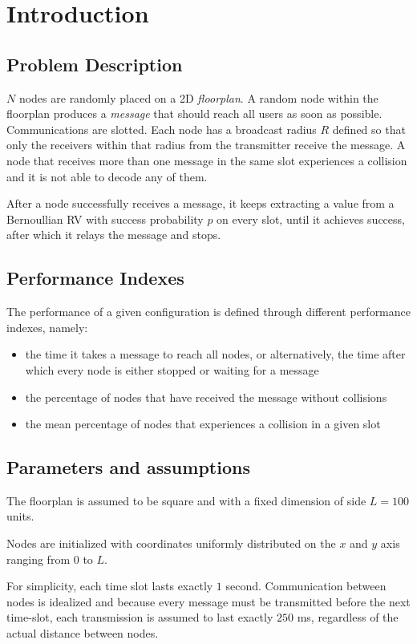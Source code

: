 \section{Introduction}
\subsection{Problem Description}
$N$ nodes are randomly placed on a 2D \textit{floorplan}. A random node within the floorplan produces a \textit{message} that should reach all users as soon as possible. Communications are slotted. Each node has a broadcast radius $R$ defined so that only the receivers within that radius from the transmitter receive the message. A node that receives more than one message in the same slot experiences a collision and it is not able to decode any of them.

After a node successfully receives a message, it keeps extracting a value from a Bernoullian RV with success probability $p$ on every slot, until it achieves success, after which it relays the message and stops.

\subsection{Performance Indexes}\label{sec:perf-index}
The performance of a given configuration is defined through different performance indexes, namely:
\begin{itemize}
\item the time it takes a message to reach all nodes, or alternatively, the time after which every node is either stopped or waiting for a message
\item the percentage of nodes that have received the message without collisions
\item the mean percentage of nodes that experiences a collision in a given slot
\end{itemize}
\subsection{Parameters and assumptions}\label{params-and-assumtions}
The floorplan is assumed to be square and with a fixed dimension of side $L = 100$ units.

Nodes are initialized with coordinates uniformly distributed on the $x$ and $y$ axis ranging from $0$ to $L$.

For simplicity, each time slot lasts exactly $1$ second. Communication between nodes is idealized and because every message must be transmitted before the next time-slot, each transmission is assumed to last exactly $250$ ms, regardless of the actual distance between nodes.

